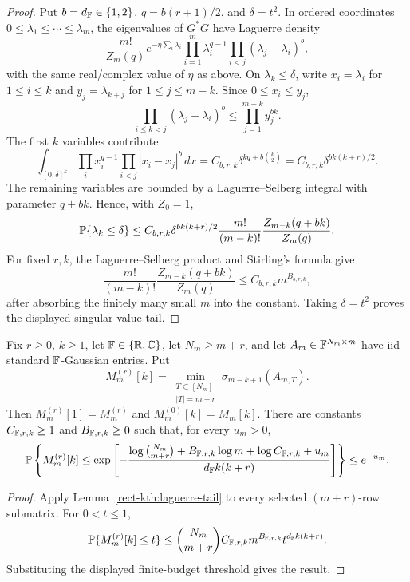 \begin{proof}
Put \(b=d_{\mathbb{F}}\in\{1,2\}\), \(q=b(r+1)/2\), and \(\delta=t^2\).  In ordered
coordinates \(0\le\lambda_1\le\cdots\le\lambda_m\), the eigenvalues of \(G^*G\)
have Laguerre density
\[
  \frac{m!}{Z_m(q)}
  e^{-\eta\sum_i\lambda_i}
  \prod_{i=1}^m \lambda_i^{q-1}
  \prod_{i<j}(\lambda_j-\lambda_i)^b,
\]
with the same real/complex value of \(\eta\) as above.  On
\(\lambda_k\le\delta\), write \(x_i=\lambda_i\) for \(1\le i\le k\) and
\(y_j=\lambda_{k+j}\) for \(1\le j\le m-k\).  Since \(0\le x_i\le y_j\),
\[
  \prod_{i\le k<j}(\lambda_j-\lambda_i)^b
  \le \prod_{j=1}^{m-k} y_j^{bk}.
\]
The first \(k\) variables contribute
\[
  \int_{[0,\delta]^k}\prod_i x_i^{q-1}
        \prod_{i<j}|x_i-x_j|^b\,dx
  =
  C_{b,r,k}\delta^{kq+b\binom{k}{2}}
  =
  C_{b,r,k}\delta^{bk(k+r)/2}.
\]
The remaining variables are bounded by a Laguerre--Selberg integral with
parameter \(q+bk\).  Hence, with \(Z_0=1\),
\[
  \mathbb{P}\{\lambda_k\le\delta\}
  \le
  C_{b,r,k}\delta^{bk(k+r)/2}
  \frac{m!}{(m-k)!}\frac{Z_{m-k}(q+bk)}{Z_m(q)} .
\]
For fixed \(r,k\), the Laguerre--Selberg product and Stirling's formula give
\[
  \frac{m!}{(m-k)!}\frac{Z_{m-k}(q+bk)}{Z_m(q)}
  \le C_{b,r,k}m^{B_{b,r,k}},
\]
after absorbing the finitely many small \(m\) into the constant.  Taking
\(\delta=t^2\) proves the displayed singular-value tail.
\end{proof}

\begin{theorem}\label{rect-kth:lower}
Fix \(r\ge0\), \(k\ge1\), let \(\mathbb{F}\in\{\mathbb{R},\mathbb{C}\}\), let \(N_m\ge m+r\), and let
\(A_m\in\mathbb{F}^{N_m\times m}\) have iid standard \(\mathbb{F}\)-Gaussian entries.  Put
\[
  M_m^{(r)}[k]
  =
  \min_{\substack{T\subset[N_m]\\ |T|=m+r}}
  \sigma_{m-k+1}(A_{m,T}).
\]
Then \(M_m^{(r)}[1]=M_m^{(r)}\) and \(M_m^{(0)}[k]=M_m[k]\).  There are constants
\(C_{\mathbb{F},r,k}\ge1\) and \(B_{\mathbb{F},r,k}\ge0\) such that, for every \(u_m>0\),
\[
  \mathbb{P}\left\{
  M_m^{(r)}[k]\le
  \exp\left[-\frac{\log\binom{N_m}{m+r}
    +B_{\mathbb{F},r,k}\log m+\log C_{\mathbb{F},r,k}+u_m}
  {d_{\mathbb{F}} k(k+r)}\right]\right\}
  \le e^{-u_m}.
\]
\end{theorem}

\begin{proof}
Apply Lemma~\ref{rect-kth:laguerre-tail} to every selected
\((m+r)\)-row submatrix.  For \(0<t\le1\),
\[
  \mathbb{P}\{M_m^{(r)}[k]\le t\}
  \le \binom{N_m}{m+r}C_{\mathbb{F},r,k}m^{B_{\mathbb{F},r,k}}t^{d_{\mathbb{F}} k(k+r)} .
\]
Substituting the displayed finite-budget threshold gives the result.
\end{proof}

